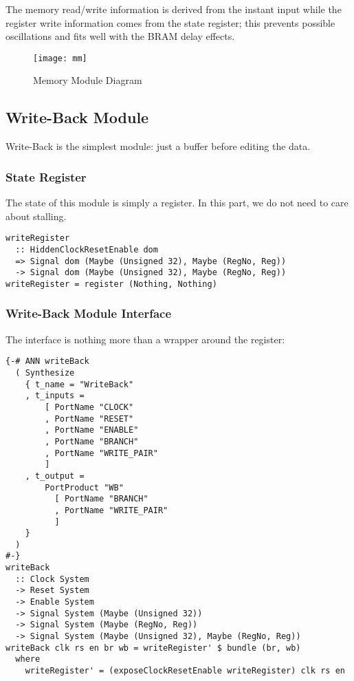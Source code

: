 The memory read/write information is derived from the instant input while the register write information comes from the state register; this prevents possible oscillations and fits well with the BRAM delay effects.
\begin{figure}[H]
	\centering
	\texttt{[image: mm]}
	\caption{Memory Module Diagram}
\end{figure}
\subsection{Write-Back Module}
Write-Back is the simplest module: just a buffer before editing the data.
\subsubsection{State Register}
The state of this module is simply a register. In this part, we do not need to care about stalling.
\begin{verbatim}
writeRegister 
  :: HiddenClockResetEnable dom
  => Signal dom (Maybe (Unsigned 32), Maybe (RegNo, Reg))
  -> Signal dom (Maybe (Unsigned 32), Maybe (RegNo, Reg))
writeRegister = register (Nothing, Nothing)
\end{verbatim}
\subsubsection{Write-Back Module Interface}
The interface is nothing more than a wrapper around the register:
\begin{verbatim}
{-# ANN writeBack
  ( Synthesize 
    { t_name = "WriteBack"
    , t_inputs =
        [ PortName "CLOCK"
        , PortName "RESET"
        , PortName "ENABLE"
        , PortName "BRANCH"
        , PortName "WRITE_PAIR"
        ]
    , t_output =
        PortProduct "WB" 
          [ PortName "BRANCH"
          , PortName "WRITE_PAIR"
          ]
    }
  )
#-}
writeBack 
  :: Clock System
  -> Reset System
  -> Enable System
  -> Signal System (Maybe (Unsigned 32))
  -> Signal System (Maybe (RegNo, Reg))
  -> Signal System (Maybe (Unsigned 32), Maybe (RegNo, Reg))
writeBack clk rs en br wb = writeRegister' $ bundle (br, wb)
  where
    writeRegister' = (exposeClockResetEnable writeRegister) clk rs en
\end{verbatim}